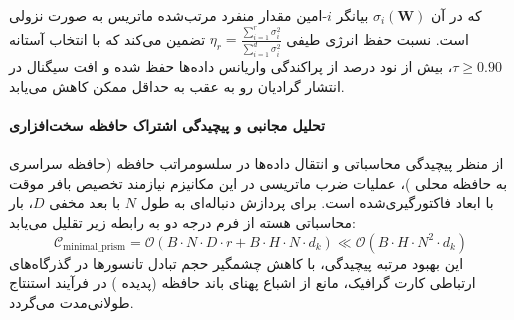 

که در آن $\sigma_i(\mathbf{W})$ بیانگر $i$-امین مقدار منفرد مرتب‌شده ماتریس به صورت نزولی است. نسبت حفظ انرژی طیفی $\eta_r = \frac{\sum_{i=1}^r \sigma_i^2}{\sum_{i=1}^{d} \sigma_i^2}$ تضمین می‌کند که با انتخاب آستانه $\tau \ge 0.90$، بیش از نود درصد از پراکندگی واریانس داده‌ها حفظ شده و افت سیگنال در انتشار گرادیان رو به عقب به حداقل ممکن کاهش می‌یابد.

\paragraph{تحلیل مجانبی و پیچیدگی اشتراک حافظه سخت‌افزاری}
از منظر پیچیدگی محاسباتی و انتقال داده‌ها در سلسومراتب حافظه (حافظه سراسری  به حافظه محلی )، عملیات ضرب ماتریسی در این مکانیزم نیازمند تخصیص بافر موقت با ابعاد فاکتورگیری‌شده است. برای پردازش دنباله‌ای به طول $N$ با بعد مخفی $D$، بار محاسباتی هسته از فرم درجه دو به رابطه زیر تقلیل می‌یابد:
\begin{equation}
\label{eq:complexity_minimal_prism}
\mathcal{C}_{\text{minimal\_prism}} = \mathcal{O}\left( B \cdot N \cdot D \cdot r + B \cdot H \cdot N \cdot d_k \right) \ll \mathcal{O}\left( B \cdot H \cdot N^2 \cdot d_k \right)
\end{equation}
این بهبود مرتبه پیچیدگی، با کاهش چشمگیر حجم تبادل تانسورها در گذرگاه‌های ارتباطی کارت گرافیک، مانع از اشباع پهنای باند حافظه (پدیده ) در فرآیند استنتاج طولانی‌مدت می‌گردد.
